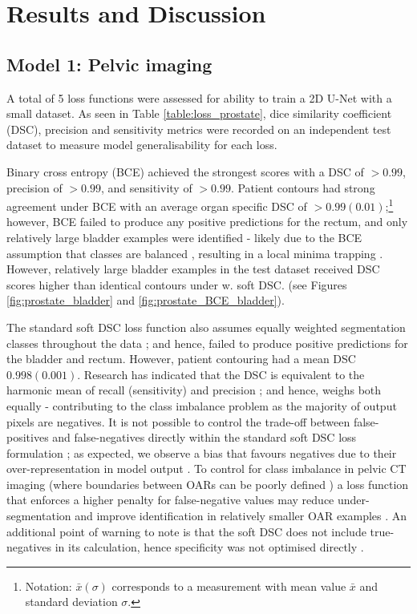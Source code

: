 \chapter{Results and Discussion}
\label{ch:results}

\section{Model 1: Pelvic imaging}
A total of 5 loss functions were assessed for ability to train a 2D U-Net with a
small dataset. As seen in Table \ref{table:loss_prostate}, dice similarity
coefficient (DSC), precision and sensitivity metrics were recorded on an
independent test dataset to measure model generalisability for each loss.

Binary cross entropy (BCE) achieved the strongest scores with a DSC of $>0.99$,
precision of $>0.99$, and sensitivity of $>0.99$. Patient contours had strong
agreement under BCE with an average organ specific DSC of $>
0.99(0.01)$;\footnote{Notation: $\bar{x}(\sigma)$ corresponds to a measurement
with mean value $\bar{x}$ and standard deviation $\sigma$.} however, BCE failed
to produce any positive predictions for the rectum, and only relatively large
bladder examples were identified - likely due to the BCE assumption that classes
are balanced \cite{Ronneberger_2015}, resulting in a local minima trapping
\cite{Khan2019}. However, relatively large bladder examples in the test dataset
received DSC scores higher than identical contours under w. soft DSC. (see
Figures \ref{fig:prostate_bladder} and \ref{fig:prostate_BCE_bladder}).

The standard soft DSC loss function also assumes equally weighted segmentation
classes throughout the data \cite{Sudre_2017}; and hence, failed to produce
positive predictions for the bladder and rectum. However, patient contouring had
a mean DSC $0.998(0.001)$. Research has indicated that the DSC is equivalent to
the harmonic mean of recall (sensitivity) and precision \cite{Bebis2019}; and
hence, weighs both equally \cite{Bebis2019} - contributing to the class
imbalance problem as the majority of output pixels are negatives. It is not
possible to control the trade-off between false-positives and false-negatives
directly within the standard soft DSC loss formulation \cite{taghanaki2018}; as
expected, we observe a bias that favours negatives due to their
over-representation in model output \cite{taghanaki2018}. To control for class
imbalance in pelvic CT imaging (where boundaries between OARs can be poorly
defined \cite{Liu_2020}) a loss function that enforces a higher penalty for
false-negative values may reduce under-segmentation and improve identification
in relatively smaller OAR examples \cite{taghanaki2018}. An additional point of
warning to note is that the soft DSC does not include true-negatives in its
calculation, hence specificity was not optimised directly \cite{taghanaki2018}.


